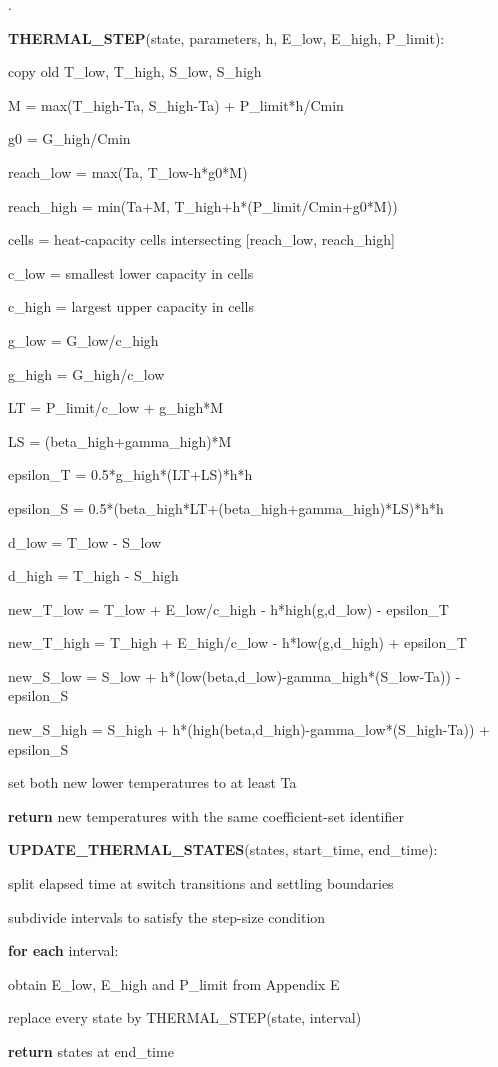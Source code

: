 \documentclass[11pt,letterpaper]{article}
\newcounter{pseudoline}
\newenvironment{pseudocode}{%
  \par\begingroup\small
  \setcounter{pseudoline}{0}
  \begin{list}{\arabic{pseudoline}.}{%
    \usecounter{pseudoline}
    \setlength{\leftmargin}{2.5em}
    \setlength{\labelwidth}{1.9em}
    \setlength{\labelsep}{0.6em}
    \setlength{\itemsep}{0.15em}
    \setlength{\parsep}{0pt}
    \setlength{\topsep}{0.35em}}%
  }{\end{list}\endgroup\par}
\newcommand{\pcstep}[2]{%
  \item \hspace*{#1em}%
  \parbox[t]{\dimexpr\linewidth-#1em\relax}{\raggedright #2\strut}}
\begin{document}
\begin{pseudocode}
\pcstep{0.0}{\textbf{THERMAL\_\allowbreak{}STEP}(state, parameters, h, E\_\allowbreak{}low, E\_\allowbreak{}high, P\_\allowbreak{}limit):}
\pcstep{1.0}{copy old T\_\allowbreak{}low, T\_\allowbreak{}high, S\_\allowbreak{}low, S\_\allowbreak{}high}
\pcstep{1.0}{M = max(T\_\allowbreak{}high-Ta, S\_\allowbreak{}high-Ta) + P\_\allowbreak{}limit*h/Cmin}
\pcstep{1.0}{g0 = G\_\allowbreak{}high/Cmin}
\pcstep{1.0}{reach\_\allowbreak{}low = max(Ta, T\_\allowbreak{}low-h*g0*M)}
\pcstep{1.0}{reach\_\allowbreak{}high = min(Ta+M, T\_\allowbreak{}high+h*(P\_\allowbreak{}limit/Cmin+g0*M))}
\pcstep{1.0}{cells = heat-capacity cells intersecting [reach\_\allowbreak{}low, reach\_\allowbreak{}high]}
\pcstep{1.0}{c\_\allowbreak{}low = smallest lower capacity in cells}
\pcstep{1.0}{c\_\allowbreak{}high = largest upper capacity in cells}
\pcstep{1.0}{g\_\allowbreak{}low = G\_\allowbreak{}low/c\_\allowbreak{}high}
\pcstep{1.0}{g\_\allowbreak{}high = G\_\allowbreak{}high/c\_\allowbreak{}low}
\pcstep{1.0}{LT = P\_\allowbreak{}limit/c\_\allowbreak{}low + g\_\allowbreak{}high*M}
\pcstep{1.0}{LS = (beta\_\allowbreak{}high+gamma\_\allowbreak{}high)*M}
\pcstep{1.0}{epsilon\_\allowbreak{}T = 0.5*g\_\allowbreak{}high*(LT+LS)*h*h}
\pcstep{1.0}{epsilon\_\allowbreak{}S = 0.5*(beta\_\allowbreak{}high*LT+(beta\_\allowbreak{}high+gamma\_\allowbreak{}high)*LS)*h*h}
\pcstep{1.0}{d\_\allowbreak{}low = T\_\allowbreak{}low - S\_\allowbreak{}low}
\pcstep{1.0}{d\_\allowbreak{}high = T\_\allowbreak{}high - S\_\allowbreak{}high}
\pcstep{1.0}{new\_\allowbreak{}T\_\allowbreak{}low = T\_\allowbreak{}low + E\_\allowbreak{}low/c\_\allowbreak{}high - h*high(g,d\_\allowbreak{}low) - epsilon\_\allowbreak{}T}
\pcstep{1.0}{new\_\allowbreak{}T\_\allowbreak{}high = T\_\allowbreak{}high + E\_\allowbreak{}high/c\_\allowbreak{}low - h*low(g,d\_\allowbreak{}high) + epsilon\_\allowbreak{}T}
\pcstep{1.0}{new\_\allowbreak{}S\_\allowbreak{}low = S\_\allowbreak{}low + h*(low(beta,d\_\allowbreak{}low)-gamma\_\allowbreak{}high*(S\_\allowbreak{}low-Ta)) - epsilon\_\allowbreak{}S}
\pcstep{1.0}{new\_\allowbreak{}S\_\allowbreak{}high = S\_\allowbreak{}high + h*(high(beta,d\_\allowbreak{}high)-gamma\_\allowbreak{}low*(S\_\allowbreak{}high-Ta)) + epsilon\_\allowbreak{}S}
\pcstep{1.0}{set both new lower temperatures to at least Ta}
\pcstep{1.0}{\textbf{return} new temperatures with the same coefficient-set identifier}
\par\vspace{0.35em}
\pcstep{0.0}{\textbf{UPDATE\_\allowbreak{}THERMAL\_\allowbreak{}STATES}(states, start\_\allowbreak{}time, end\_\allowbreak{}time):}
\pcstep{1.0}{split elapsed time at switch transitions and settling boundaries}
\pcstep{1.0}{subdivide intervals to satisfy the step-size condition}
\pcstep{1.0}{\textbf{for each} interval:}
\pcstep{2.0}{obtain E\_\allowbreak{}low, E\_\allowbreak{}high and P\_\allowbreak{}limit from Appendix E}
\pcstep{2.0}{replace every state by THERMAL\_\allowbreak{}STEP(state, interval)}
\pcstep{1.0}{\textbf{return} states at end\_\allowbreak{}time}
\end{pseudocode}
\end{document}

